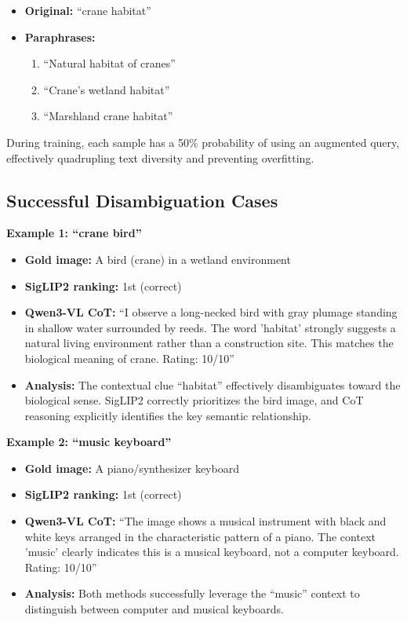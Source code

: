\documentclass[11pt]{article}
\begin{document}
\begin{itemize}
    \item \textbf{Original:} ``crane habitat''
    \item \textbf{Paraphrases:}
    \begin{enumerate}
        \item ``Natural habitat of cranes''
        \item ``Crane's wetland habitat''
        \item ``Marshland crane habitat''
    \end{enumerate}
\end{itemize}

During training, each sample has a 50\% probability of using an augmented query, effectively quadrupling text diversity and preventing overfitting.

\subsection{Successful Disambiguation Cases}

\textbf{Example 1: ``crane bird''}
\begin{itemize}
    \item \textbf{Gold image:} A bird (crane) in a wetland environment
    \item \textbf{SigLIP2 ranking:} 1st (correct)
    \item \textbf{Qwen3-VL CoT:} ``I observe a long-necked bird with gray plumage standing in shallow water surrounded by reeds. The word 'habitat' strongly suggests a natural living environment rather than a construction site. This matches the biological meaning of crane. Rating: 10/10''
    \item \textbf{Analysis:} The contextual clue ``habitat'' effectively disambiguates toward the biological sense. SigLIP2 correctly prioritizes the bird image, and CoT reasoning explicitly identifies the key semantic relationship.
\end{itemize}

\textbf{Example 2: ``music keyboard''}
\begin{itemize}
    \item \textbf{Gold image:} A piano/synthesizer keyboard
    \item \textbf{SigLIP2 ranking:} 1st (correct)
    \item \textbf{Qwen3-VL CoT:} ``The image shows a musical instrument with black and white keys arranged in the characteristic pattern of a piano. The context 'music' clearly indicates this is a musical keyboard, not a computer keyboard. Rating: 10/10''
    \item \textbf{Analysis:} Both methods successfully leverage the ``music'' context to distinguish between computer and musical keyboards.
\end{itemize}
\end{document}

